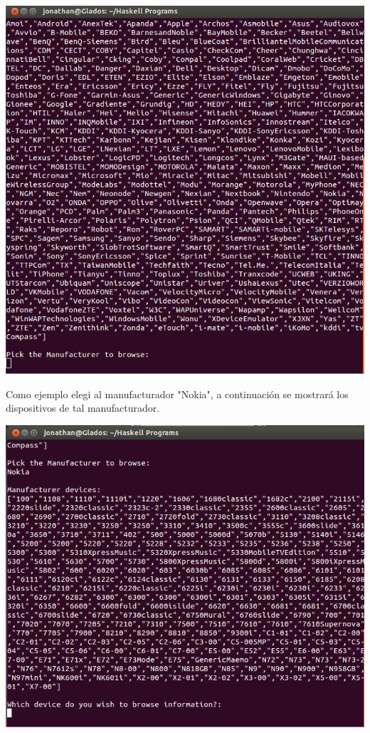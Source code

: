 \documentclass[11pt]{article} %
\begin{document}
\begin{center}
\includegraphics[scale=0.4]{screens/haskell2.png}
\end{center}
Como ejemplo elegi al manufacturador "Nokia", a continuación se mostrará los dispositivos de tal manufacturador.
\begin{center}
\includegraphics[scale=0.4]{screens/haskell3.png}
\end{center}
\end{document}
